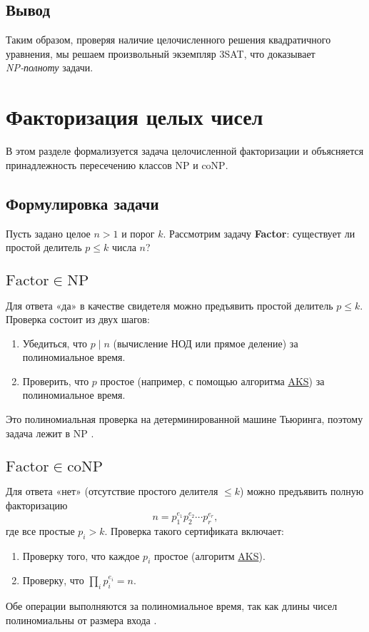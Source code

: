 \documentclass[a4paper,12pt]{article}
\begin{document}
\subsection{Вывод}
Таким образом, проверяя наличие целочисленного решения квадратичного уравнения, мы решаем произвольный экземпляр 3SAT, что доказывает \emph{NP‑полноту} задачи.
\newpage
\section{Факторизация целых чисел}

В этом разделе формализуется задача целочисленной факторизации и объясняется принадлежность пересечению классов \(\mathrm{NP}\) и \(\mathrm{coNP}\).

\subsection{Формулировка задачи}

Пусть задано целое \(n>1\) и порог \(k\). Рассмотрим задачу \textbf{Factor}: существует ли простой делитель \(p\le k\) числа \(n\)?

\subsection{\(\mathrm{Factor}\in\mathrm{NP}\)}

Для ответа «да» в качестве свидетеля можно предъявить простой делитель \(p\le k\).
Проверка состоит из двух шагов:
\begin{enumerate}
  \item Убедиться, что \(p\mid n\) (вычисление НОД или прямое деление) за полиномиальное время.
  \item Проверить, что \(p\) простое (например, с помощью алгоритма \hyperref[sec:aks]{AKS}) за полиномиальное время.
\end{enumerate}
Это полиномиальная проверка на детерминированной машине Тьюринга, поэтому задача лежит в NP \cite{CSSEWhyFactor}.

\subsection{\(\mathrm{Factor}\in\mathrm{coNP}\)}

Для ответа «нет» (отсутствие простого делителя \(\le k\)) можно предъявить полную факторизацию
\[
n = p_1^{e_1} p_2^{e_2} \cdots p_r^{e_r},
\]
где все простые \(p_i>k\).
Проверка такого сертификата включает:
\begin{enumerate}
  \item Проверку того, что каждое \(p_i\) простое (алгоритм \hyperref[sec:aks]{AKS}).
  \item Проверку, что \(\prod\limits_i p_i^{e_i} = n\).
\end{enumerate}
Обе операции выполняются за полиномиальное время, так как длины чисел полиномиальны от размера входа \cite{InfEdinburgh}.
\end{document}

